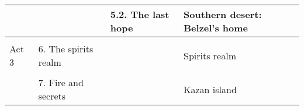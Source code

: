 \begin{longtable}[H]{|p{2cm}|p{3cm}|p{3cm}|p{3cm}|}
 & \multicolumn{1}{l|}{} & \multicolumn{1}{l|}{5.2. The last hope} & Southern desert: Belzel's home \\ \hline
\multicolumn{4}{|l|}{} \\ \hline
\multicolumn{1}{|l|}{\cellcolor[HTML]{C0C0C0}Act 3} & \multicolumn{1}{l|}{6. The spirits realm} & \multicolumn{1}{l|}{} & Spirits realm \\ \hline
 &  &  &  \\ \cline{2-4} 
 & \multicolumn{1}{l|}{7. Fire and secrets} & \multicolumn{1}{l|}{} & Kazan island \\ \hline

\end{longtable}
\hspace{0pt} \\ %
